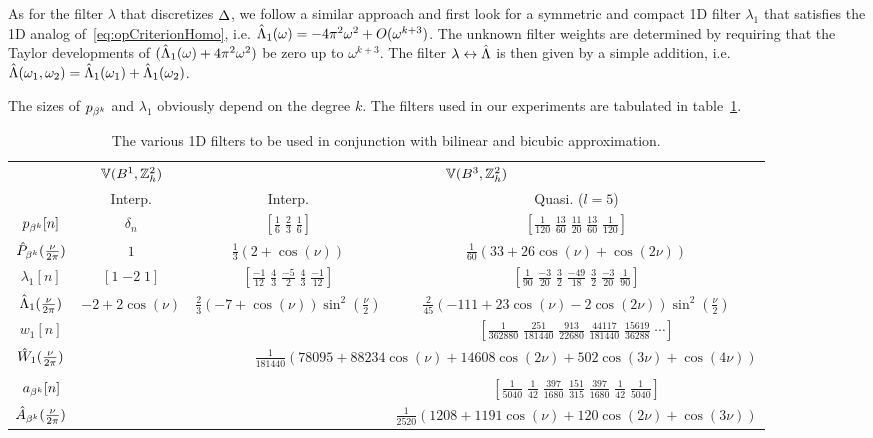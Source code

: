 As for the filter $\lambda$ that discretizes $\laplacian$, we follow a similar approach and first look for a symmetric and compact 1D filter $\lambda_1$ that satisfies the 1D analog of~\eqref{eq:opCriterionHomo}, i.e. $\ft{\Lambda}_1(\omega) = -4\pi^2\omega^2 + O(\omega^{k+3})$. 
The unknown filter weights are determined by requiring that the Taylor developments of $(\ft{\Lambda}_1(\omega) + 4\pi^2\omega^2)$ be zero up to $\omega^{k+3}$. The filter $\ftpairs{\lambda}{\ft{\Lambda}}$ is then given by a simple addition, i.e. $\ft{\Lambda}(\omega_1,\omega_2) = \ft{\Lambda}_1(\omega_1) + \ft{\Lambda}_1(\omega_2)$. 

The sizes of $p_{\cbs^k}$ and $\lambda_1$ obviously depend on the degree $k$. 
The filters used in our experiments are tabulated in table~\ref{tab:filters}.

\begin{table}[t!]
  \footnotesize
  \caption[Poisson filters for the Cartesian lattice]{The various 1D filters to
  be used in conjunction with bilinear and bicubic approximation.}
  \label{tab:filters}
  \centering
  \begin{tabular}{cc|cc}
    \toprule
     & $\aspace{\ints^2_h}{\tpbs^1}$ & \multicolumn{2}{c}{$\aspace{\ints^2_h}{\tpbs^3}$}\\
     & Interp. & Interp. & Quasi. ($l=5$)\\
    \midrule
    $p_{\cbs^k}[n]$ & $\delta_n$ & $[\tfrac{1}{6}\; \tfrac{2}{3}\; \tfrac{1}{6}]$& $[\tfrac{1}{120}\; \tfrac{13}{60}\; \tfrac{11}{20}\; \tfrac{13}{60}\; \tfrac{1}{120}]$\\
    $\ft{P}_{\cbs^k}(\tfrac{\nu}{2\pi})$ & $1$ & $\tfrac{1}{3}(2 + \cos(\nu))$&
    $\tfrac{1}{60}(33+26\cos(\nu) + \cos(2\nu))$\\
    \midrule
    $\lambda_1[n]$ & $[1\; {-2}\; 1]$ & $[\tfrac{-1}{12}\; \tfrac{4}{3}\;
    \tfrac{-5}{2}\; \tfrac{4}{3}\; \tfrac{-1}{12}]$& $[\tfrac{1}{90}\; \tfrac{-3}{20}\; \tfrac{3}{2}\; \tfrac{-49}{18}\; \tfrac{3}{2}\; \tfrac{-3}{20}\; \tfrac{1}{90}]$\\
    $\ft{\Lambda}_1(\tfrac{\nu}{2\pi})$ & $-2 + 2\cos(\nu)$&
    $\tfrac{2}{3}(-7+\cos(\nu))\sin^2(\tfrac{\nu}{2})$& $\tfrac{2}{45}(-111 + 23\cos(\nu) - 2\cos(2\nu))\sin^2(\tfrac{\nu}{2})$\\
    \midrule
    $w_1[n]$ & & & $[\tfrac{1}{362880}\; \tfrac{251}{181440}\;
    \tfrac{913}{22680}\; \tfrac{44117}{181440}\; \tfrac{15619}{36288}\; \cdots]$\\
    $\ft{W}_1(\tfrac{\nu}{2\pi})$ & &
    \multicolumn{2}{r}{$\scriptscriptstyle{\tfrac{1}{181440}(78095 + 88234\cos(\nu) + 14608\cos(2\nu) + 502\cos(3\nu)+ \cos(4\nu))}$}\\
    & & & \\
    $a_{\cbs^k}[n]$ & & & $[\tfrac{1}{5040}\; \tfrac{1}{42}\;
    \tfrac{397}{1680}\; \tfrac{151}{315}\; \tfrac{397}{1680}\; \tfrac{1}{42}\; \tfrac{1}{5040}]$\\
    $\ft{A}_{\cbs^k}(\tfrac{\nu}{2\pi})$ & & & $\scriptscriptstyle{\tfrac{1}{2520}(1208 + 1191\cos(\nu) + 120\cos(2\nu) + \cos(3\nu))}$\\
    \bottomrule
  \end{tabular}
\end{table}

